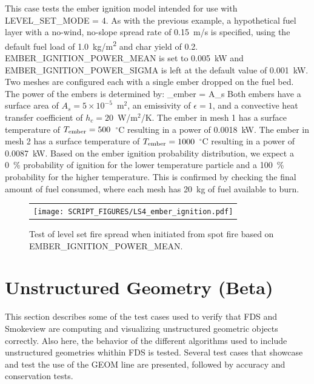 \documentclass[11pt]{book}
\begin{document}
This case tests the ember ignition model intended for use with {\ct LEVEL\_SET\_MODE = 4}. As with the previous example, a hypothetical fuel layer with a no-wind, no-slope spread rate of 0.15~m/s is specified, using the default fuel load of 1.0~\unit{kg/m^2} and char yield of 0.2. {\ct EMBER\_IGNITION\_POWER\_MEAN} is set to 0.005~kW and {\ct EMBER\_IGNITION\_POWER\_SIGMA} is left at the default value of 0.001~kW. Two meshes are configured each with a single ember dropped on the fuel bed. The power of the embers is determined by:
\be
{}_{\rm ember} = A_s 
\ee
Both embers have a surface area of $A_s=5 \times 10^{-5}$~m$^2$, an emissivity of $\epsilon = 1$, and a convective heat transfer coefficient of $h_c = 20$~W/m$^2$/K. The ember in mesh 1 has a surface temperature of $T_{\rm ember} = 500$~$^\circ$C resulting in a power of 0.0018~kW. The ember in mesh 2 has a surface temperature of $T_{\rm ember} = 1000$~$^\circ$C resulting in a power of 0.0087~kW. Based on the ember ignition probability distribution, we expect a 0~\% probability of ignition for the lower temperature particle and a 100~\% probability for the higher temperature. This is confirmed by checking the final amount of fuel consumed, where each mesh has 20~kg of fuel available to burn.

\begin{figure}[h]
\begin{center}
\begin{tabular}{c}
 \texttt{[image: SCRIPT\_FIGURES/LS4\_ember\_ignition.pdf]}
\end{tabular}
\end{center}
 \caption[Level set ember ignition]{Test of level set fire spread when initiated from spot fire based on {\ct EMBER\_IGNITION\_POWER\_MEAN}.}
\label{fig:LS4_ember_ignition}
\end{figure}


\ifcompgeom

\chapter{Unstructured Geometry (Beta)}

This section describes some of the test cases used to verify that FDS and Smokeview are computing
and visualizing unstructured geometric objects correctly. Also here, the behavior of the different
algorithms used to include unstructured geometries whithin FDS is tested. Several test cases that showcase
and test the use of the {\ct GEOM} line are presented, followed by accuracy and conservation tests.
\end{document}
